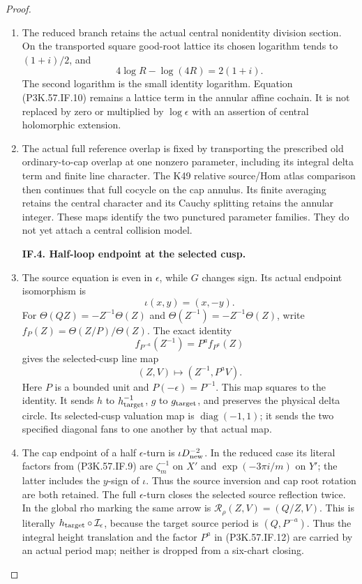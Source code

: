 \begin{proof}
\begin{enumerate}[label=\arabic*.]
\item The reduced branch retains the actual central nonidentity division section.
On the transported square good-root lattice its chosen logarithm tends to
\((1+i)/2\), and
\[
                   4\log R-\log(4R)=2(1+i).             \tag{P3K.57.IF.10}
\]
The second logarithm is the small identity logarithm. Equation (P3K.57.IF.10)
remains a lattice term in the annular affine cochain. It is not replaced by
zero or multiplied by \(\log\epsilon\) with an assertion of central
holomorphic extension.

\item The actual full reference overlap is fixed by transporting the prescribed
old ordinary-to-cap overlap at one nonzero parameter, including its integral
delta term and finite line character. The K49 relative source/Hom atlas
comparison then continues that full cocycle on the cap annulus. Its finite
averaging retains the central character and its Cauchy splitting retains the
annular integer. These maps identify the two punctured parameter families.
They do not yet attach a central collision model.

\par\medskip\noindent\textbf{IF.4. Half-loop endpoint at the selected cusp.}\par\nopagebreak[4]

\item The source equation is even in \(\epsilon\), while \(G\) changes sign. Its
actual endpoint isomorphism is
\[
                  \iota(x,y)=(x,-y).                    \tag{P3K.57.IF.11}
\]
For \(\Theta(QZ)=-Z^{-1}\Theta(Z)\) and
\(\Theta(Z^{-1})=-Z^{-1}\Theta(Z)\), write
\(f_P(Z)=\Theta(Z/P)/\Theta(Z)\). The exact identity
\[
 f_{P^{-a}}(Z^{-1})=P^a f_{P^a}(Z)
\]
gives the selected-cusp line map
\[
                  (Z,V)\longmapsto(Z^{-1},P^a V).       \tag{P3K.57.IF.12}
\]
Here \(P\) is a bounded unit and \(P(-\epsilon)=P^{-1}\). This map squares
to the identity. It sends \(h\) to \(h_{\rm target}^{-1}\), \(g\) to
\(g_{\rm target}\), and preserves the physical delta circle.
Its selected-cusp valuation map is \(\operatorname{diag}(-1,1)\); it sends
the two specified diagonal fans to one another by that actual map.

\item The cap endpoint of a half \(\epsilon\)-turn is
\(\iota D_{\rm new}^{-2}\). In the reduced case its literal factors from
(P3K.57.IF.9) are \(\zeta_m^{-1}\) on \(X'\) and
\(\exp(-3\pi i/m)\) on \(Y'\); the latter includes the \(y\)-sign of
\(\iota\). Thus the source inversion and cap root rotation are both retained.
The full \(\epsilon\)-turn closes the selected source reflection twice.
In the global rho marking the same arrow is
\(\mathcal R_\rho(Z,V)=(Q/Z,V)\). This is literally
\(h_{\rm target}\circ\mathcal I_\epsilon\), because the target
source period is \((Q,P^{-a})\). Thus the integral height
translation and the factor \(P^a\) in (P3K.57.IF.12) are carried by an
actual period map; neither is dropped from a six-chart closing.


\end{enumerate}
\end{proof}
